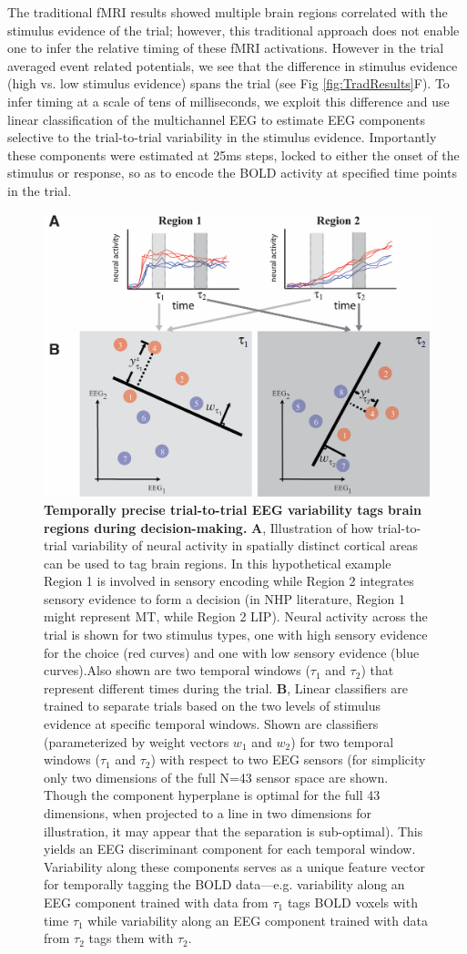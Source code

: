 The traditional fMRI results showed multiple brain regions correlated with the stimulus evidence of the trial; however, this traditional approach does not enable one to infer the relative timing of these fMRI activations. However in the trial averaged event related potentials, we see that the difference in stimulus evidence (high vs. low stimulus evidence) spans the trial (see Fig \ref{fig:TradResults}F). To infer timing at a scale of tens of milliseconds, we exploit this difference and use linear classification \cite{Parra2005,Sajda2009} of the multichannel EEG to estimate EEG components selective to the trial-to-trial variability in the stimulus evidence.  Importantly these components were estimated at 25ms steps, locked to either the onset of the stimulus or response, so as to encode the BOLD activity at specified time points in the trial.  
\begin{figure}[tb!]
\centering
\includegraphics[width=.6\textwidth]{Fig3.png}
\caption{\textbf{Temporally precise trial-to-trial EEG variability tags brain regions during decision-making.}
\textbf{A}, Illustration of how trial-to-trial variability of neural activity in spatially distinct cortical areas can be used to tag brain regions. In this hypothetical example Region 1 is involved in sensory encoding while Region 2 integrates sensory evidence to form a decision (in NHP literature, Region 1 might represent MT, while Region 2 LIP). Neural activity across the trial is shown for two stimulus types, one with high sensory evidence for the choice (red curves) and one with low sensory evidence (blue curves).Also shown are two temporal windows ($\tau_{1}$ and $\tau_{2}$) that represent different times during the trial. \textbf{B}, Linear classifiers are trained to separate trials based on the two levels of stimulus evidence at specific temporal windows.  Shown are classifiers (parameterized by weight vectors $w_{1}$ and $w_{2}$) for two temporal windows ($\tau_{1}$ and $\tau_{2}$) with respect to two EEG sensors (for simplicity only two dimensions of the full N=43 sensor space are shown.  Though the component hyperplane is optimal for the full 43 dimensions, when projected to a line in two dimensions for illustration, it may appear that the separation is sub-optimal). This yields an EEG discriminant component for each temporal window. Variability along these components serves as a unique feature vector for temporally tagging the BOLD data—e.g. variability along an EEG component trained with data from $\tau_{1}$ tags BOLD voxels with time $\tau_{1}$ while variability along an EEG component trained with data from $\tau_{2}$ tags them with $\tau_{2}$.}
\label{fig:variability}
\end{figure}
